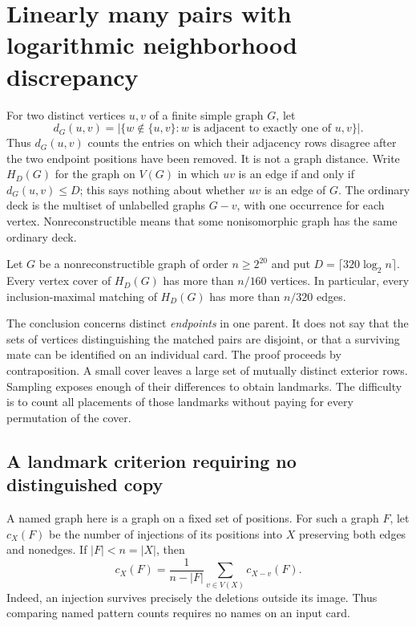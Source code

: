 \section{Linearly many pairs with logarithmic neighborhood discrepancy}
\label{geo:section}

For two distinct vertices $u,v$ of a finite simple graph $G$, let
\[
 d_G(u,v)=\bigl|\{w\notin\{u,v\}:\text{$w$ is adjacent to exactly one of $u,v$}\}\bigr|.
\]
Thus $d_G(u,v)$ counts the entries on which their adjacency rows disagree
after the two endpoint positions have been removed. It is not a graph
distance. Write $H_D(G)$ for the graph on $V(G)$ in which $uv$ is an
edge if and only if $d_G(u,v)\le D$; this says nothing about whether
$uv$ is an edge of $G$. The ordinary deck is the multiset of unlabelled
graphs $G-v$, with one occurrence for each vertex. Nonreconstructible
means that some nonisomorphic graph has the same ordinary deck.

\begin{theorem}\label{geo:matching}
Let $G$ be a nonreconstructible graph of order $n\ge 2^{20}$ and put
$D=\lceil320\log_2 n\rceil$. Every vertex cover of $H_D(G)$ has more
than $n/160$ vertices. In particular, every inclusion-maximal matching
of $H_D(G)$ has more than $n/320$ edges.
\end{theorem}

The conclusion concerns distinct \emph{endpoints} in one parent. It does
not say that the sets of vertices distinguishing the matched pairs are
disjoint, or that a surviving mate can be identified on an individual
card. The proof proceeds by contraposition. A small cover leaves a large
set of mutually distinct exterior rows. Sampling exposes enough of their
differences to obtain landmarks. The difficulty is to count all placements
of those landmarks without paying for every permutation of the cover.

\subsection{A landmark criterion requiring no distinguished copy}

A named graph here is a graph on a fixed set of positions. For such a
graph $F$, let $c_X(F)$ be the number of injections of its positions
into $X$ preserving both edges and nonedges. If $|F|<n=|X|$, then
\begin{equation}
 c_X(F)=\frac{1}{n-|F|}\sum_{v\in V(X)}c_{X-v}(F).
 \label{geo:proper}
\end{equation}
Indeed, an injection survives precisely the deletions outside its image.
Thus comparing named pattern counts requires no names on an input card.

